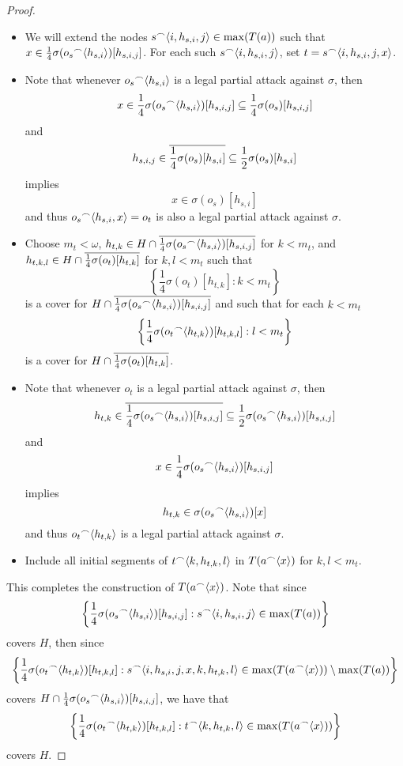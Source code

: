 \begin{proof}
  \begin{itemize}
    \item
    We will extend the nodes $s{^\frown}\langle i,h_{s,i},j\rangle\in\max(T(a))$ such
    that $x\in \frac{1}{4}\sigma(o_s{^\frown}\langle h_{s,i}\rangle)[h_{s,i,j}]$.
    For each such $s{^\frown}\langle i,h_{s,i},j\rangle$, set $t=s{^\frown}\langle i,h_{s,i},j,x\rangle$.
    \item
    Note that whenever $o_s{^\frown}\langle h_{s,i}\rangle$ is a legal partial attack
    against $\sigma$, then
      \[
        x
          \in
        \frac{1}{4}\sigma(o_s{^\frown}\langle h_{s,i}\rangle)[h_{s,i,j}]
          \subseteq
        \frac{1}{4}\sigma(o_s)[h_{s,i,j}]
      \]
    and
      \[
        h_{s,i,j}
          \in
        \overline{\frac{1}{4}\sigma(o_s)[h_{s,i}]}
          \subseteq
        \frac{1}{2}\sigma(o_s)[h_{s,i}]
      \]
    implies
      \[
        x
          \in
        \sigma(o_s)[h_{s,i}]
      \]
    and thus $o_s{^\frown}\langle h_{s,i},x\rangle=o_t$ is also a legal partial attack
    against $\sigma$.
    \item
    Choose $m_t<\omega$,
    $h_{t,k}\in H\cap \overline{\frac{1}{4}\sigma(o_s{^\frown}\langle h_{s,i}\rangle)[h_{s,i,j}]}$
    for $k<m_t$, and
    $h_{t,k,l}\in H\cap\overline{\frac{1}{4}\sigma(o_t)[h_{t,k}]}$
    for $k,l<m_t$ such that
      \[
        \left\{\frac{1}{4}\sigma(o_t)[h_{t,k}]:k<m_t\right\}
      \]
    is a cover for
    $H\cap \overline{\frac{1}{4}\sigma(o_s{^\frown}\langle h_{s,i}\rangle)[h_{s,i,j}]}$
    and such that for each $k<m_t$
      \[
        \left\{\frac{1}{4}\sigma(o_t{^\frown}\langle h_{t,k}\rangle)[h_{t,k,l}]:l<m_t\right\}
      \]
    is a cover for $H\cap\overline{\frac{1}{4}\sigma(o_t)[h_{t,k}]}$.
    \item
    Note that whenever $o_t$ is a legal partial attack against $\sigma$, then
      \[
        h_{t,k}
          \in
        \overline{\frac{1}{4}\sigma(o_s{^\frown}\langle h_{s,i}\rangle)[h_{s,i,j}]}
          \subseteq
        \frac{1}{2}\sigma(o_s{^\frown}\langle h_{s,i}\rangle)[h_{s,i,j}]
      \]
    and
      \[
        x
          \in
        \frac{1}{4}\sigma(o_s{^\frown}\langle h_{s,i}\rangle)[h_{s,i,j}]
      \]
    implies
      \[
        h_{t,k}
          \in
        \sigma(o_s{^\frown}\langle h_{s,i}\rangle)[x]
      \]
    and thus $o_t{^\frown}\langle h_{t,k}\rangle$ is a legal partial attack against $\sigma$.
    \item
    Include all initial segments of $t{^\frown}\langle k,h_{t,k},l\rangle$ in
    $T(a{^\frown}\langle x\rangle)$ for $k,l<m_t$.
  \end{itemize}


 This completes the construction of  $ T(a{^\frown}\langle x\rangle)$. Note that since
    \[
      \left\{
        \frac{1}{4}\sigma(o_s{^\frown}\langle h_{s,i}\rangle)[h_{s,i,j}]
      :
        s{^\frown}\langle i,h_{s,i},j\rangle\in\max(T(a))
      \right\}
    \]
  covers $H$, then since
    \[
      \left\{
        \frac{1}{4}\sigma(o_t{^\frown}\langle h_{t,k}\rangle)[h_{t,k,l}]
      :
        s{^\frown}\langle i,h_{s,i},j,x,k,h_{t,k},l\rangle
          \in
        \max(T(a{^\frown}\langle x\rangle))\setminus\max(T(a))
      \right\}
    \]
  covers $H\cap \frac{1}{4}\sigma(o_s{^\frown}\langle h_{s,i}\rangle)[h_{s,i,j}]$, we have that
    \[
      \left\{
        \frac{1}{4}\sigma(o_t{^\frown}\langle h_{t,k}\rangle)[h_{t,k,l}]
      :
        t{^\frown}\langle k,h_{t,k},l\rangle\in\max(T(a{^\frown}\langle x\rangle))
      \right\}
    \]
  covers $H$.


\end{proof}
